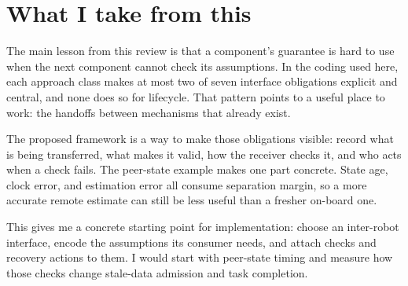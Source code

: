 \section{What I take from this}
\label{sec:conclusion}

The main lesson from this review is that a component's guarantee is hard to use
when the next component cannot check its assumptions.  In the coding used here,
each approach class makes at most two of seven interface obligations explicit
and central, and none does so for lifecycle.  That pattern points to a useful
place to work: the handoffs between mechanisms that already exist.

The proposed framework is a way to make those obligations visible: record what
is being transferred, what makes it valid, how the receiver checks it, and who
acts when a check fails.  The peer-state example makes one part concrete.  State
age, clock error, and estimation error all consume separation margin, so a more
accurate remote estimate can still be less useful than a fresher on-board one.

This gives me a concrete starting point for implementation: choose an
inter-robot interface, encode the assumptions its consumer needs, and attach
checks and recovery actions to them.  I would start with peer-state timing and
measure how those checks change stale-data admission and task completion.
